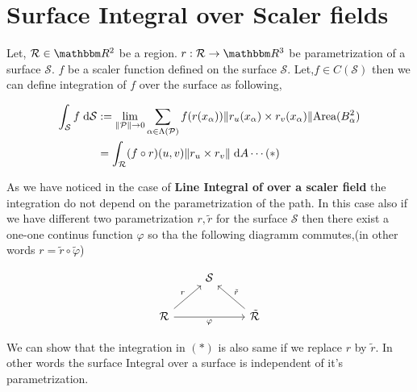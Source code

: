 \documentclass[../Analysis-3]{subfiles}
\begin{document}
\section{Surface Integral over Scaler fields}

Let, $\mathcal{R} \in \R^2$ be a region. $r:\mathcal{R} \to \R^3$ be parametrization of a surface $\mathcal{S}$. $f$ be a scaler function defined on the surface $\mathcal{S}$. Let,$f \in C(\mathcal{S})$ then we can define integration of $f$ over the surface as following,

\begin{align*} 
    \int_{\mathcal{S}} f \hspace{0.1cm} \dd \mathcal{S} &:= \lim_{\norm{\mathcal{P}} \to 0} \sum_{\alpha \in \Lambda (\mathcal{P})} f(r(x_{\alpha})) \norm{r_u(x_{\alpha}) \times r_v(x_{\alpha})} \text{Area}(B_{\alpha}^2) \\
    &= \int_{\mathcal{R}} (f \circ r)(u,v) \norm{r_u \times r_v} \hspace{0.1cm} \dd A \cdots (*)
\end{align*}

As we have noticed in the case of \textbf{Line Integral of over a scaler field} the integration do not depend on the parametrization of the path. In this case also if we have different two parametrization $r,\tilde{r}$ for the surface $\mathcal{S}$ then there exist a one-one continus function $\varphi$ so tha the following diagramm commutes,(in other words $r = \tilde{r} \circ \tilde{\varphi}$)

\[\begin{tikzcd}
	& {\mathcal{S}} \\
	{\mathcal{R}} && {\tilde{\mathcal{R}}}
	\arrow["r", from=2-1, to=1-2]
	\arrow["{\tilde{r}}"', from=2-3, to=1-2]
	\arrow["\varphi"', from=2-1, to=2-3]
\end{tikzcd}\]
 
We can show that the integration in $(*)$ is also same if we replace $r$ by $\tilde{r}$. In other words the surface Integral over a surface is independent of it's parametrization.
\end{document}
